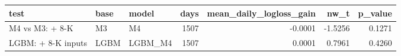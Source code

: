 \begin{tabular}{lllrrrr}
\toprule
test & base & model & days & mean\_daily\_logloss\_gain & nw\_t & p\_value \\
\midrule
M4 vs M3: + 8-K & M3 & M4 & 1507 & -0.0001 & -1.5256 & 0.1271 \\
LGBM: + 8-K inputs & LGBM & LGBM\_M4 & 1507 & 0.0001 & 0.7961 & 0.4260 \\
\bottomrule
\end{tabular}
